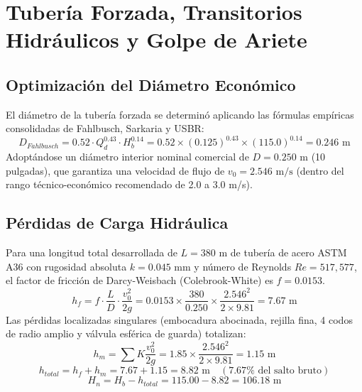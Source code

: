 \documentclass[11pt,a4paper]{report}
\begin{document}
\chapter{Tubería Forzada, Transitorios Hidráulicos y Golpe de Ariete}
\section{Optimización del Diámetro Económico}
El diámetro de la tubería forzada se determinó aplicando las fórmulas empíricas consolidadas de Fahlbusch, Sarkaria y USBR:
\begin{equation}
D_{Fahlbusch} = 0.52 \cdot Q_d^{0.43} \cdot H_b^{0.14} = 0.52 \times (0.125)^{0.43} \times (115.0)^{0.14} = 0.246\text{ m}
\end{equation}
Adoptándose un diámetro interior nominal comercial de $D = 0.250\text{ m}$ (10 pulgadas), que garantiza una velocidad de flujo de $v_0 = 2.546\text{ m/s}$ (dentro del rango técnico-económico recomendado de 2.0 a 3.0 m/s).

\section{Pérdidas de Carga Hidráulica}
Para una longitud total desarrollada de $L = 380\text{ m}$ de tubería de acero ASTM A36 con rugosidad absoluta $k = 0.045\text{ mm}$ y número de Reynolds $Re = 517,577$, el factor de fricción de Darcy-Weisbach (Colebrook-White) es $f = 0.0153$.
\begin{equation}
h_f = f \cdot \frac{L}{D} \cdot \frac{v_0^2}{2g} = 0.0153 \times \frac{380}{0.250} \times \frac{2.546^2}{2 \times 9.81} = 7.67\text{ m}
\end{equation}
Las pérdidas localizadas singulares (embocadura abocinada, rejilla fina, 4 codos de radio amplio y válvula esférica de guarda) totalizan:
\begin{equation}
h_m = \sum K \frac{v_0^2}{2g} = 1.85 \times \frac{2.546^2}{2 \times 9.81} = 1.15\text{ m}
\end{equation}
\begin{equation}
h_{total} = h_f + h_m = 7.67 + 1.15 = 8.82\text{ m} \quad (7.67\% \text{ del salto bruto})
\end{equation}
\begin{equation}
H_n = H_b - h_{total} = 115.00 - 8.82 = 106.18\text{ m}
\end{equation}
\end{document}

